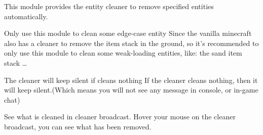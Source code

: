 
This module provides the entity cleaner to remove specified entities automatically.

\begin{note}{Only use this module to clean some edge-case entity}
    Since the vanilla minecraft also has a cleaner to remove the item stack in the ground, so it's recommended to only use this module to clean some weak-loading entities, like: the sand item stack \ldots
\end{note}


\begin{note}{The cleaner will keep silent if cleans nothing}
    If the cleaner cleans nothing, then it will keep silent.(Which means you will not see any message in console, or in-game chat)
\end{note}

\begin{tips}{See what is cleaned in cleaner broadcast.}
    Hover your mouse on the cleaner broadcast, you can see what has been removed.
\end{tips}

